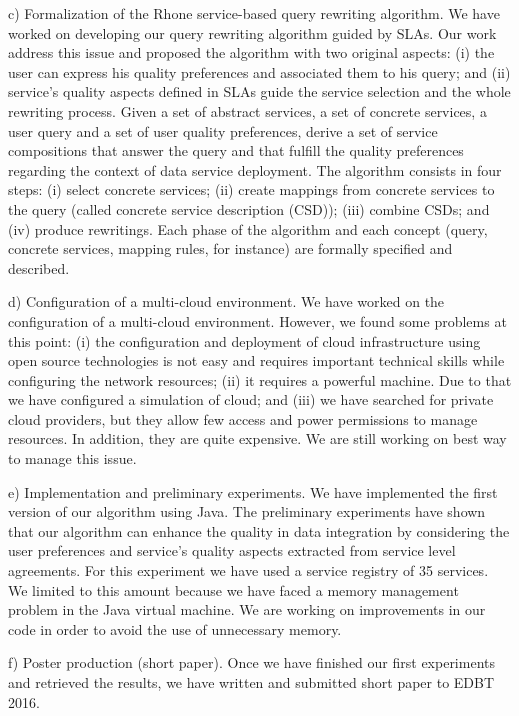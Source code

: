 \documentclass[11pt,a4paper,oneside]{report}
\begin{document}
c) Formalization of the Rhone service-based query rewriting algorithm. We have worked on developing our query rewriting algorithm guided by SLAs. Our work address this issue and proposed the algorithm with two original aspects: (i) the user can express his quality preferences and associated them to his query; and (ii) service’s quality aspects defined in SLAs guide the service selection and the whole rewriting process.  Given a set of abstract services, a set of concrete services, a user query and a set of user quality preferences, derive a set of service compositions that answer the query and that fulfill the quality preferences regarding the context of data service deployment. The algorithm consists in four steps: (i) select concrete services; (ii) create mappings from concrete services to the query (called concrete service description (CSD)); (iii) combine CSDs; and (iv) produce rewritings. Each phase of the algorithm and each concept (query, concrete services, mapping rules, for instance) are formally specified and described.

d) Configuration of a multi-cloud environment. We have worked on the configuration of a multi-cloud environment. However, we found some problems at this point: (i) the configuration and deployment of cloud infrastructure using open source technologies is not easy and requires important technical skills while configuring the network resources; (ii) it requires a powerful machine. Due to that we have configured a simulation of cloud; and (iii) we have searched for private cloud providers, but they allow few access and power permissions to manage resources. In addition, they are quite expensive. We are still working on best way to manage this issue.

e) Implementation and preliminary experiments. We have implemented the first version of our algorithm using Java. The preliminary experiments have shown that our algorithm can enhance the quality in data integration by considering the user preferences and service’s quality aspects extracted from service level agreements. For this experiment we have used a service registry of 35 services. We limited to this amount because we have faced a memory management problem in the Java virtual machine. We are working on improvements in our code in order to avoid the use of unnecessary memory.

f) Poster production (short paper). Once we have finished our first experiments and retrieved the results, we have written and submitted short paper to EDBT 2016. 
\end{document}
